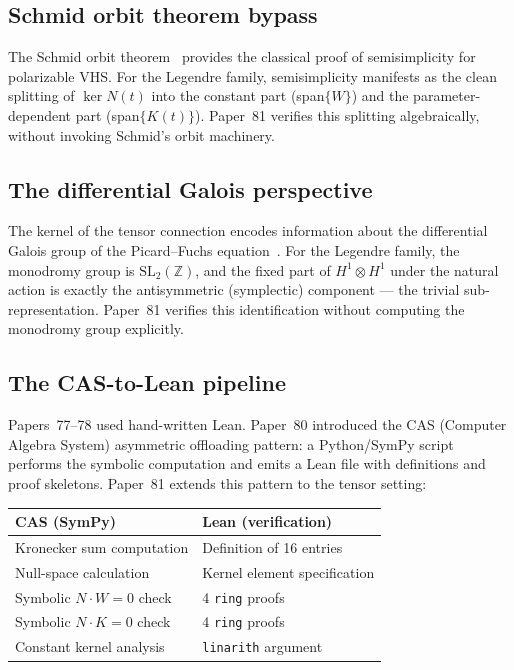 \documentclass[11pt]{article}
\theoremstyle{plain}
\theoremstyle{definition}
\theoremstyle{remark}
\newcommand{\Z}{\mathbb{Z}}
\begin{document}
\subsection{Schmid orbit theorem bypass}

The Schmid orbit theorem~\cite{Schmid1973} provides the
classical proof of semisimplicity for polarizable VHS.
For the Legendre family, semisimplicity manifests as the
clean splitting of $\ker N(t)$ into the constant part
(span$\{W\}$) and the parameter-dependent part
(span$\{K(t)\}$).  Paper~81 verifies this splitting
algebraically, without invoking Schmid's orbit machinery.

\subsection{The differential Galois perspective}

The kernel of the tensor connection encodes information
about the differential Galois group of the Picard--Fuchs
equation~\cite{Katz1972}.  For the Legendre family, the
monodromy group is $\mathrm{SL}_2(\Z)$, and the fixed
part of $H^1 \otimes H^1$ under the natural action is
exactly the antisymmetric (symplectic) component --- the
trivial sub-representation.  Paper~81 verifies this
identification without computing the monodromy group
explicitly.

\subsection{The CAS-to-Lean pipeline}

Papers~77--78 used hand-written Lean.  Paper~80 introduced
the CAS (Computer Algebra System) asymmetric offloading
pattern: a Python/SymPy script performs the symbolic
computation and emits a Lean file with definitions and
proof skeletons.  Paper~81 extends this pattern to
the tensor setting:

\begin{center}
\begin{tabular}{ll}
\toprule
\textbf{CAS (SymPy)} & \textbf{Lean (verification)} \\
\midrule
Kronecker sum computation & Definition of 16 entries \\
Null-space calculation & Kernel element specification \\
Symbolic $N \cdot W = 0$ check & 4 \texttt{ring} proofs \\
Symbolic $N \cdot K = 0$ check & 4 \texttt{ring} proofs \\
Constant kernel analysis & \texttt{linarith} argument \\
\bottomrule
\end{tabular}
\end{center}
\end{document}
